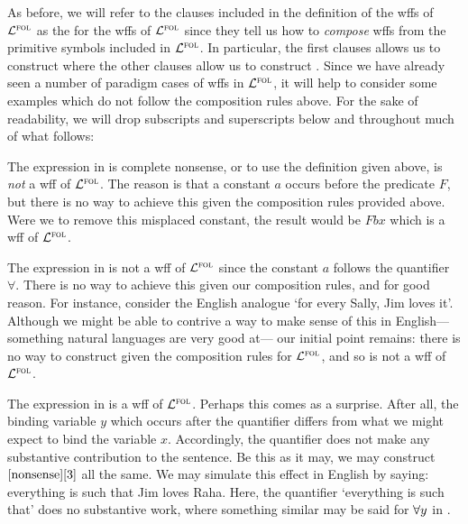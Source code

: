 As before, we will refer to the clauses included in the definition of the wffs of $\mathcal{L}^{\textsc{fol}}$ as the  for the wffs of $\mathcal{L}^{\textsc{fol}}$ since they tell us how to \textit{compose} wffs from the primitive symbols included in $\mathcal{L}^{\textsc{fol}}$.
In particular, the first clauses allows us to construct  where the other clauses allow us to construct .
Since we have already seen a number of paradigm cases of wffs in $\mathcal{L}^{\textsc{fol}}$, it will help to consider some examples which do not follow the composition rules above.
For the sake of readability, we will drop subscripts and superscripts below and throughout much of what follows:

\begin{earg} \label{nonsense}
\end{earg}

The expression in  is complete nonsense, or to use the definition given above,  is \textit{not} a wff of $\mathcal{L}^{\textsc{fol}}$.
The reason is that a constant $a$ occurs before the predicate $F$, but there is no way to achieve this given the composition rules provided above.
Were we to remove this misplaced constant, the result would be $Fbx$ which is a wff of $\mathcal{L}^{\textsc{fol}}$. 

The expression in  is not a wff of $\mathcal{L}^{\textsc{fol}}$ since the constant $a$ follows the quantifier $\forall$.
There is no way to achieve this given our composition rules, and for good reason.
For instance, consider the English analogue `for every Sally, Jim loves it'.
Although we might be able to contrive a way to make sense of this in English--- something natural languages are very good at--- our initial point remains: there is no way to construct  given the composition rules for $\mathcal{L}^{\textsc{fol}}$, and so  is not a wff of $\mathcal{L}^{\textsc{fol}}$.

The expression in  is a wff of $\mathcal{L}^{\textsc{fol}}$.
Perhaps this comes as a surprise.
After all, the binding variable $y$ which occurs after the quantifier differs from what we might expect to bind the variable $x$.
Accordingly, the quantifier does not make any substantive contribution to the sentence.
Be this as it may, we may construct $\eref{nonsense}{3}$ all the same.
We may simulate this effect in English by saying: everything is such that Jim loves Raha.
Here, the quantifier `everything is such that' does no substantive work, where something similar may be said for $\forall y$ in .

